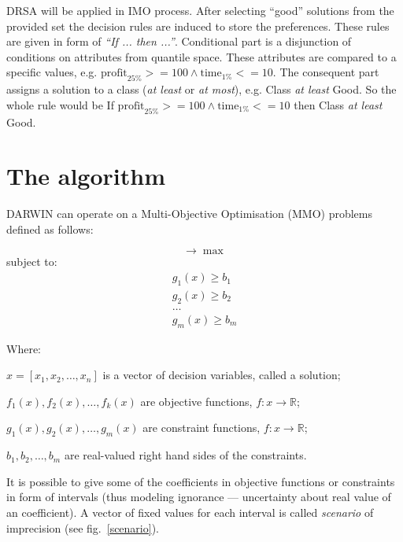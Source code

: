DRSA will be applied in IMO process. After selecting ``good'' solutions
from the provided set the decision rules are induced to store the
preferences. These rules are given in form of \textit{``If ... then
  ...''}. Conditional part is a disjunction of conditions on attributes from
quantile space. These attributes are compared to a specific values, e.g.
$\text{profit}_{25\%} >= 100 \land \text{time}_{1\%} <= 10$. The consequent
part assigns a solution to a class (\textit{at least} or \textit{at most}),
e.g. Class \textit{at least} Good. So the whole rule would be If
$\text{profit}_{25\%} >= 100 \land \text{time}_{1\%} <= 10$ then Class
\textit{at least} Good.

\section{The algorithm}

DARWIN can operate on a Multi-Objective Optimisation (MMO) problems defined as
follows:

\begin{equation}
[ f_1(x), f_2(x), \dots, f_k(x) ] \rightarrow  \max
\end{equation}
subject to:
\begin{equation}
\begin{array}{l}
g_1(x) \geq b_1 \\
g_2(x) \geq b_2 \\
\dots \\
g_m(x) \geq b_m
\end{array}
\end{equation}

Where:
\begin{description}
\item $x = [x_1, x_2, \dots, x_n]$ is a vector of decision variables, called a
  solution;
\item $f_1(x), f_2(x), \dots, f_k(x)$ are objective functions,
  $f: x \rightarrow \mathbb{R}$;
\item $g_1(x), g_2(x), \dots, g_m(x)$ are constraint functions,
  $f: x \rightarrow \mathbb{R}$;
\item $b_1, b_2, \dots, b_m$ are real-valued right hand sides of the
  constraints.
\end{description}

It is possible to give some of the coefficients in objective functions or
constraints in form of intervals (thus modeling ignorance --- uncertainty
about real value of an coefficient). A vector of fixed values for each
interval is called \textit{scenario} of imprecision (see fig.~\ref{scenario}).

